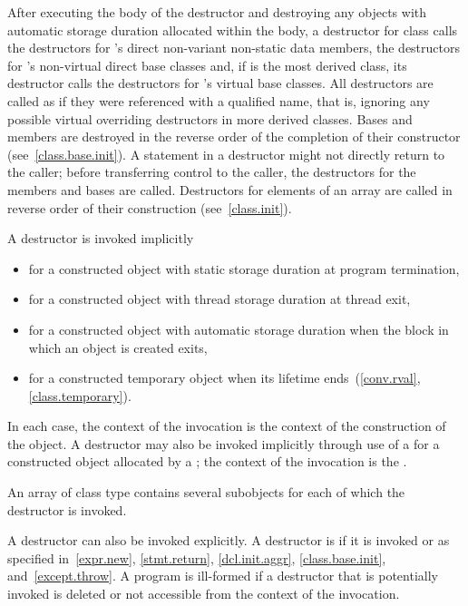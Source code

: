 \pnum
{}%
%
%
After executing the body of the destructor and destroying
any objects with automatic storage duration allocated within the body, a
destructor for class
calls the destructors for
's
direct non-variant non-static data members, the destructors for
's
non-virtual direct base classes and, if
is the most derived class,
its destructor calls the destructors for
's
virtual base classes.
All destructors are called as if they were referenced with a qualified name,
that is, ignoring any possible virtual overriding destructors in more
derived classes.
Bases and members are destroyed in the reverse order of the completion of
their constructor (see~\ref{class.base.init}).
A
statement in a destructor might not directly return to the
caller; before transferring control to the caller, the destructors for the
members and bases are called.
%
Destructors for elements of an array are called in reverse order of their
construction (see~\ref{class.init}).

\pnum
{}%
%
A destructor is invoked implicitly
\begin{itemize}
\item for a constructed object with static storage duration at program termination,

\item for a constructed object with thread storage duration at thread exit,

\item for a constructed object with automatic storage duration when the block in which an object is created exits,

\item for a constructed temporary object when its lifetime ends~(\ref{conv.rval}, \ref{class.temporary}).
\end{itemize}

%
%
In each case, the context of the invocation is the context of the construction of
the object. A destructor may also be invoked implicitly through use of a
 for a constructed object allocated
by a ; the context of the invocation is the
.
\begin{note}
An array of class type contains several subobjects for each of which
the destructor is invoked.
\end{note}
A destructor can also be invoked explicitly. A destructor is 
if it is invoked or as specified in~\ref{expr.new},
\ref{stmt.return}, \ref{dcl.init.aggr},
\ref{class.base.init}, and~\ref{except.throw}.
A program is ill-formed if a destructor that is potentially invoked is deleted
or not accessible from the context of the invocation.

